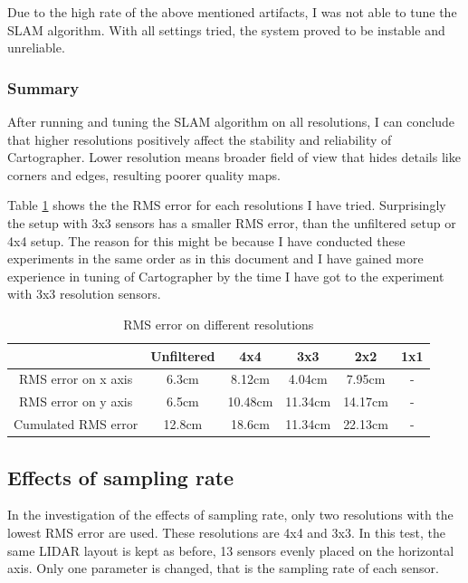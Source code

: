 Due to the high rate of the above mentioned artifacts, I was not able to tune the SLAM algorithm. With all 
settings tried, the system proved to be instable and unreliable.





\subsubsection{Summary}
After running and tuning the SLAM algorithm on all resolutions, I can conclude that higher resolutions
positively affect the stability and reliability of Cartographer. Lower resolution means broader field of 
view that hides details like corners and edges, resulting poorer quality maps.

Table \ref{tab:error_on_different_resolutions} shows the the RMS error for each resolutions I have tried.
Surprisingly the setup with 3x3 sensors has a smaller RMS error, than the unfiltered setup or 4x4 setup.
The reason for this might be because I have conducted these experiments in the same order as in this document
and I have gained more experience in tuning of Cartographer by the time I have got to the experiment with 3x3
resolution sensors. 

\begin{table}[ht]
	\centering
	\begin{tabular}{||c c c c c c||}
		\hline
                            & Unfiltered    & 4x4     & 3x3     & 2x2     & 1x1 \\
		\hline\hline
        RMS error on x axis & 6.3cm         & 8.12cm  & 4.04cm  & 7.95cm  & -\\
        \hline
        RMS error on y axis & 6.5cm         & 10.48cm & 11.34cm & 14.17cm & -\\
		\hline
        Cumulated RMS error & 12.8cm        & 18.6cm  & 11.34cm & 22.13cm & -\\
		\hline
	\end{tabular}
	\caption{RMS error on different resolutions}
	\label{tab:error_on_different_resolutions}
\end{table}






\subsection{Effects of sampling rate}
In the investigation of the effects of sampling rate, only two resolutions with the lowest RMS error
are used. These resolutions are 4x4 and 3x3. In this test, the same LIDAR layout is kept as before,
13 sensors evenly placed on the horizontal axis. Only one parameter is changed, that is the sampling 
rate of each sensor. 

